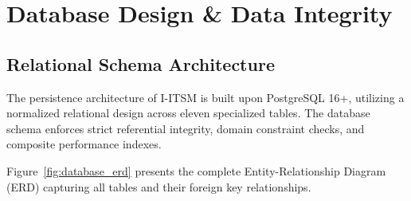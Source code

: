 \documentclass[11pt,a4paper,oneside]{report}
\begin{document}
\chapter{Database Design \& Data Integrity}
\label{ch:database}

\section{Relational Schema Architecture}
\label{sec:db_architecture}
The persistence architecture of I-ITSM is built upon PostgreSQL 16+, utilizing a normalized relational design across eleven specialized tables. The database schema enforces strict referential integrity, domain constraint checks, and composite performance indexes.

Figure~\ref{fig:database_erd} presents the complete Entity-Relationship Diagram (ERD) capturing all tables and their foreign key relationships.
\end{document}
